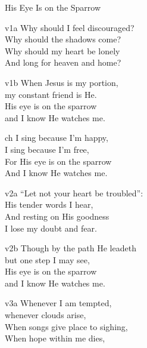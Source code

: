 \begin{song}{His Eye Is on the Sparrow}

    \begin{songframe}{v1a}
        Why should I feel discouraged? \\
        Why should the shadows come? \\
        Why should my heart be lonely \\
        And long for heaven and home?
    \end{songframe}

    \begin{songframe}{v1b}
        When Jesus is my portion, \\
        my constant friend is He. \\
        His eye is on the sparrow \\
        and I know He watches me. \\
    \end{songframe}


    \begin{songframe}{ch}
        I sing because I'm happy, \\
        I sing because I'm free, \\
        For His eye is on the sparrow \\
        And I know He watches me.
    \end{songframe}

    \begin{songframe}{v2a}
        ``Let not your heart be troubled'': \\
        His tender words I hear, \\
        And resting on His goodness \\
        I lose my doubt and fear.
    \end{songframe}

    \begin{songframe}{v2b}
        Though by the path He leadeth \\
        but one step I may see, \\
        His eye is on the sparrow \\
        and I know He watches me.
    \end{songframe}

    \begin{songframe}{v3a}
        Whenever I am tempted, \\
        whenever clouds arise, \\
        When songs give place to sighing, \\
        When hope within me dies, \\
    \end{songframe}


\end{song}
